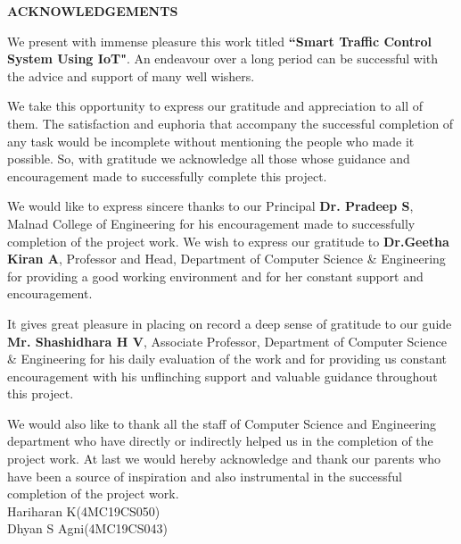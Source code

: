 \newpage
\vspace*{0.5\baselineskip}
\begin{center}
\thispagestyle{empty}
\LARGE{\textbf{ACKNOWLEDGEMENTS}}\\[0.5cm]
\end{center}
\doublespacing

We present with immense pleasure this work titled \textbf{``Smart Traffic Control System Using IoT"}. An endeavour over a long period can be successful with the advice and support of many well wishers.

We take this opportunity to express our gratitude and appreciation
to all of them. The satisfaction and euphoria that accompany the successful completion of any
task would be incomplete without mentioning the people who made it possible. So,
with gratitude we acknowledge all those whose guidance and encouragement made to
successfully complete this project.

We would like to express sincere thanks to our Principal \textbf{Dr. Pradeep S}, Malnad
College of Engineering for his encouragement made to successfully completion of the
project work. We wish to express our gratitude to \textbf{Dr.Geetha Kiran A}, Professor and Head, Department of Computer Science \& Engineering for providing a good working environment and for her constant support and encouragement.

It gives great pleasure in placing on record a deep sense of gratitude to our guide
\textbf{Mr. Shashidhara H V}, Associate Professor, Department of Computer Science \& Engineering for his daily evaluation of the work and for providing us constant encouragement with his unflinching support and valuable guidance throughout this project.

We would also like to thank all the staff of Computer Science and Engineering department who have directly or indirectly helped us in the completion of the project work. At last we would hereby acknowledge and thank our parents who have been a source of inspiration and also instrumental in the successful completion of the project work. \\

\large{\hspace*{3.5in} Hariharan K(4MC19CS050)}\\
\large{\hspace*{3.7in} Dhyan S Agni(4MC19CS043)}\\




